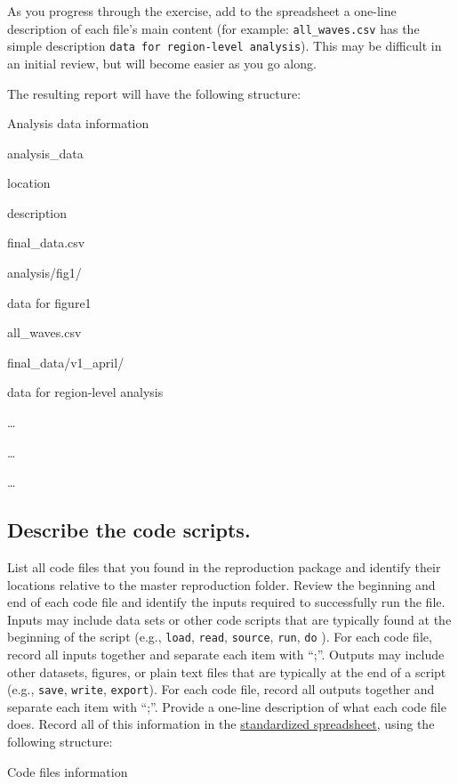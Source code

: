 \documentclass[]{book}
\begin{document}
As you progress through the exercise, add to the spreadsheet a one-line description of each file's main content (for example: \texttt{all\_waves.csv} has the simple description \texttt{data\ for\ region-level\ analysis}). This may be difficult in an initial review, but will become easier as you go along.

The resulting report will have the following structure:

\label{tab:analysis-data-information}Analysis data information

analysis\_data

location

description

final\_data.csv

analysis/fig1/

data for figure1

all\_waves.csv

final\_data/v1\_april/

data for region-level analysis

\ldots{}

\ldots{}

\ldots{}

\hypertarget{desc-scripts}{%
\subsection{Describe the code scripts.}\label{desc-scripts}}

List all code files that you found in the reproduction package and identify their locations relative to the master reproduction folder. Review the beginning and end of each code file and identify the inputs required to successfully run the file. Inputs may include data sets or other code scripts that are typically found at the beginning of the script (e.g., \texttt{load}, \texttt{read}, \texttt{source}, \texttt{run}, \texttt{do} ). For each code file, record all inputs together and separate each item with ``;''. Outputs may include other datasets, figures, or plain text files that are typically at the end of a script (e.g., \texttt{save}, \texttt{write}, \texttt{export}). For each code file, record all outputs together and separate each item with ``;''. Provide a one-line description of what each code file does. Record all of this information in the \href{https://docs.google.com/spreadsheets/d/1LUIdVFH0OfR70C7z07TYeE-uWzKI_JIeWUMaYhqEKK0/edit\#gid=1617799822\&range=A1}{standardized spreadsheet}, using the following structure:

\label{tab:code-files-information}Code files information
\end{document}
